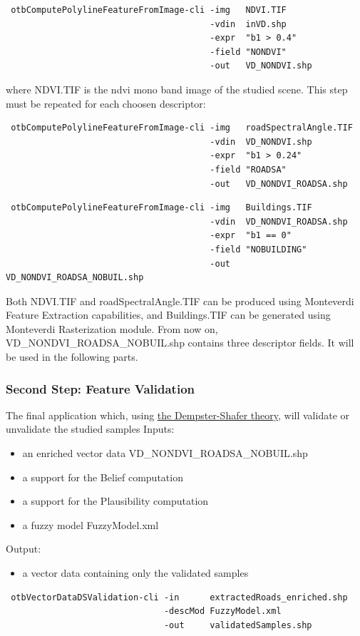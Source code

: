 \begin{verbatim}
 otbComputePolylineFeatureFromImage-cli -img   NDVI.TIF 
                                        -vdin  inVD.shp 
                                        -expr  "b1 > 0.4" 
                                        -field "NONDVI" 
                                        -out   VD_NONDVI.shp
\end{verbatim}

where NDVI.TIF is the ndvi mono band image of the studied scene.
This step must be repeated for each choosen descriptor:

\begin{verbatim}
 otbComputePolylineFeatureFromImage-cli -img   roadSpectralAngle.TIF  
                                        -vdin  VD_NONDVI.shp 
                                        -expr  "b1 > 0.24"
                                        -field "ROADSA" 
                                        -out   VD_NONDVI_ROADSA.shp
\end{verbatim}

\begin{verbatim}
 otbComputePolylineFeatureFromImage-cli -img   Buildings.TIF 
                                        -vdin  VD_NONDVI_ROADSA.shp 
                                        -expr  "b1 == 0" 
                                        -field "NOBUILDING" 
                                        -out   VD_NONDVI_ROADSA_NOBUIL.shp
\end{verbatim}

Both NDVI.TIF and roadSpectralAngle.TIF can be produced using Monteverdi Feature Extraction capabilities, and Buildings.TIF can be generated using Monteverdi Rasterization module.
From now on, VD\_NONDVI\_ROADSA\_NOBUIL.shp contains three descriptor fields. It will be used in the following parts.

\subsubsection{Second Step: Feature Validation}

The final application which, using \href{http://en.wikipedia.org/wiki/Dempster\%E2\%80\%93Shafer_theory}{the Dempster-Shafer theory}, will validate or unvalidate the studied samples
Inputs:
\begin{itemize}
\item an enriched vector data VD\_NONDVI\_ROADSA\_NOBUIL.shp
\item a support for the Belief computation
\item a support for the Plausibility computation
\item a fuzzy model FuzzyModel.xml
\end{itemize}
Output:
\begin{itemize}
\item a vector data containing only the validated samples
\end{itemize}
\begin{verbatim}
 otbVectorDataDSValidation-cli -in      extractedRoads_enriched.shp 
                               -descMod FuzzyModel.xml 
                               -out     validatedSamples.shp
\end{verbatim}
